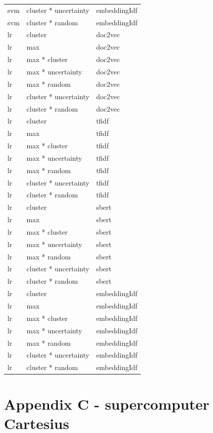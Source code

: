 \documentclass[
]{article}
\begin{document}
\begin{longtable}{lll}
svm & cluster * uncertainty & embeddingIdf\\
\addlinespace
svm & cluster * random & embeddingIdf\\
lr & cluster & doc2vec\\
lr & max & doc2vec\\
lr & max * cluster & doc2vec\\
lr & max * uncertainty & doc2vec\\
\addlinespace
lr & max * random & doc2vec\\
lr & cluster * uncertainty & doc2vec\\
lr & cluster * random & doc2vec\\
lr & cluster & tfidf\\
lr & max & tfidf\\
\addlinespace
lr & max * cluster & tfidf\\
lr & max * uncertainty & tfidf\\
lr & max * random & tfidf\\
lr & cluster * uncertainty & tfidf\\
lr & cluster * random & tfidf\\
\addlinespace
lr & cluster & sbert\\
lr & max & sbert\\
lr & max * cluster & sbert\\
lr & max * uncertainty & sbert\\
lr & max * random & sbert\\
\addlinespace
lr & cluster * uncertainty & sbert\\
lr & cluster * random & sbert\\
lr & cluster & embeddingIdf\\
lr & max & embeddingIdf\\
lr & max * cluster & embeddingIdf\\
\addlinespace
lr & max * uncertainty & embeddingIdf\\
lr & max * random & embeddingIdf\\
lr & cluster * uncertainty & embeddingIdf\\
lr & cluster * random & embeddingIdf\\*
\end{longtable}

\hypertarget{appendix-c---supercomputer-cartesius}{%
\section{Appendix C - supercomputer
Cartesius}\label{appendix-c---supercomputer-cartesius}}
\end{document}
